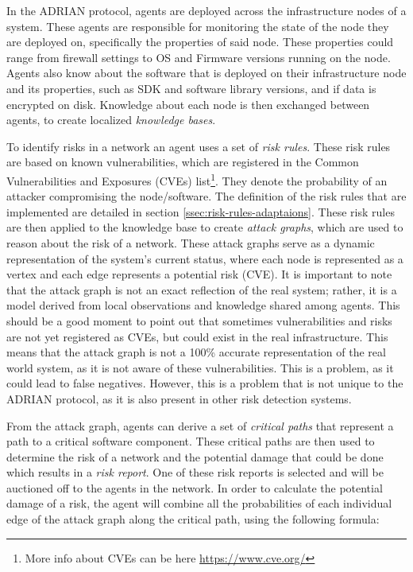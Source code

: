 In the ADRIAN protocol, agents are deployed across the infrastructure nodes of a system. These agents are responsible for monitoring the state of the node they are deployed on, specifically the properties of said node. These properties could range from firewall settings to OS and Firmware versions running on the node. Agents also know about the software that is deployed on their infrastructure node and its properties, such as SDK and software library versions, and if data is encrypted on disk. Knowledge about each node is then exchanged between agents, to create localized \emph{knowledge bases}.

\vspace{0.5em}
To identify risks in a network an agent uses a set of \emph{risk rules}. These risk rules are based on known vulnerabilities, which are registered in the Common Vulnerabilities and Exposures (CVEs) list\footnote{More info about CVEs can be here \url{https://www.cve.org/} }. They denote the probability of an attacker compromising the node/software. The definition of the risk rules that are implemented are detailed in section \ref{ssec:risk-rules-adaptaions}.
These risk rules are then applied to the knowledge base to create \emph{attack graphs}, which are used to reason about the risk of a network. These attack graphs serve as a dynamic representation of the system's current status, where each node is represented as a vertex and each edge represents a potential risk (CVE). It is important to note that the attack graph is not an exact reflection of the real system; rather, it is a model derived from local observations and knowledge shared among agents. 
This should be a good moment to point out that sometimes vulnerabilities and risks are not yet registered as CVEs, but could exist in the real infrastructure. This means that the attack graph is not a 100\% accurate representation of the real world system, as it is not aware of these vulnerabilities. This is a problem, as it could lead to false negatives. However, this is a problem that is not unique to the ADRIAN protocol, as it is also present in other risk detection systems.

From the attack graph, agents can derive a set of \emph{critical paths} that represent a path to a critical software component. These critical paths are then used to determine the risk of a network and the potential damage that could be done which results in a \emph{risk report}. One of these risk reports is selected and will be auctioned off to the agents in the network. In order to calculate the potential damage of a risk, the agent will combine all the probabilities of each individual edge of the attack graph along the critical path, using the following formula:

